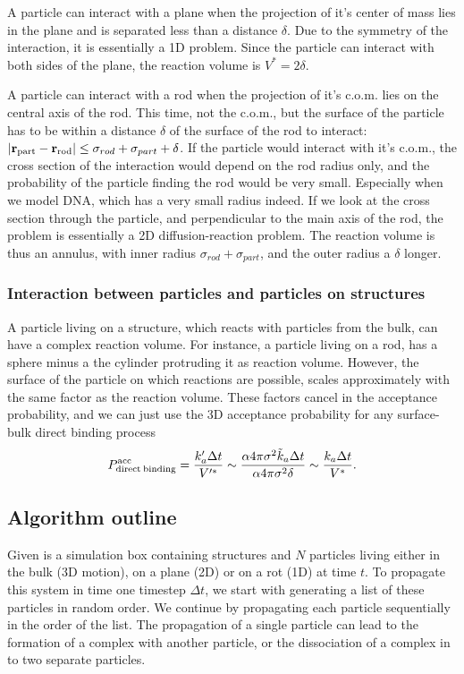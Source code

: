 A particle can interact with a plane when the projection of it's center of mass lies in the plane and is separated less than a distance $\delta$. Due to the symmetry of the interaction, it is essentially a 1D problem. Since the particle can interact with both sides of the plane, the reaction volume is $V^*=2 \delta$.

A particle can interact with a rod when the projection of it's c.o.m. lies on the central axis of the rod. This time, not the c.o.m., but the surface of the particle has to be within a distance $\delta$ of the surface of the rod to interact: $|{\bf r}_{\rm part}-{\bf r}_{\rm rod}| \leq \sigma_{rod}+\sigma_{part} + \delta$. If the particle would interact with it's c.o.m., the cross section of the interaction would depend on the rod radius only, and the probability of the particle finding the rod would be very small. Especially when we model DNA, which has a very small radius indeed. If we look at the cross section through the particle, and perpendicular to the main axis of the rod, the problem is essentially a 2D diffusion-reaction problem. The reaction volume is thus an annulus, with inner radius $\sigma_{rod} + \sigma_{part}$, and the outer radius a $\delta$ longer.

\subsubsection{Interaction between particles and particles on structures}
A particle living on a structure, which reacts with particles from the bulk, can have a complex reaction volume. For instance, a particle living on a rod, has a sphere minus a the cylinder protruding it as reaction volume. However, the surface of the particle on which reactions are possible, scales approximately with the same factor as the reaction volume. These factors cancel in the acceptance probability, and we can just use the 3D acceptance probability for any surface-bulk direct binding process
\begin{equation}
 P^{\rm acc}_{\rm direct\:binding} = \frac{k'_a \Delta t}{V'^*} \sim \frac{ \alpha 4 \pi \sigma^2 \tilde{k}_a \Delta t}{\alpha 4 \pi \sigma^2 \delta} \sim \frac{k_a \Delta t}{V^*}.
\end{equation}


\subsection{Algorithm outline}
Given is a simulation box containing structures and $N$ particles living either in the bulk (3D motion), on a plane (2D) or on a rot (1D) at time $t$. To propagate this system in time one timestep $\Delta t$, we start with generating a list of these particles in random order. We continue by propagating each particle sequentially in the order of the list. The propagation of a single particle can lead to the formation of a complex with another particle, or the dissociation of a complex in to two separate particles. 

